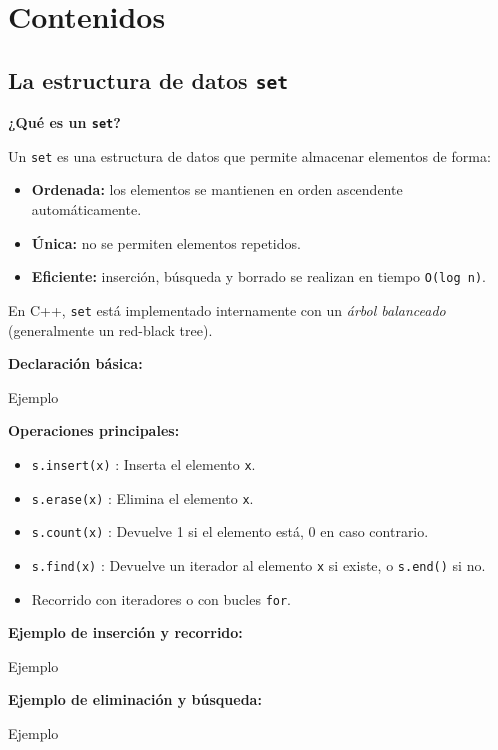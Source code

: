 \documentclass{article}
\newcommand{\cppfile}[2][]{
    \begin{container}{\faCode \space \space  #1}
        
    \end{container}
}
\begin{document}
\section{Contenidos}

\subsection{La estructura de datos \texttt{set}}

\textbf{¿Qué es un \texttt{set}?}

Un \texttt{set} es una estructura de datos que permite almacenar elementos de forma:
\begin{itemize}
    \item \textbf{Ordenada:} los elementos se mantienen en orden ascendente automáticamente.
    \item \textbf{Única:} no se permiten elementos repetidos.
    \item \textbf{Eficiente:} inserción, búsqueda y borrado se realizan en tiempo \texttt{O(log n)}.
\end{itemize}

En C++, \texttt{set} está implementado internamente con un \textit{árbol balanceado} (generalmente un red-black tree).

\textbf{Declaración básica:}

\cppfile[Ejemplo]{codes/set1.cpp}

\textbf{Operaciones principales:}
\begin{itemize}
    \item \texttt{s.insert(x)} : Inserta el elemento \texttt{x}.
    \item \texttt{s.erase(x)} : Elimina el elemento \texttt{x}.
    \item \texttt{s.count(x)} : Devuelve 1 si el elemento está, 0 en caso contrario.
    \item \texttt{s.find(x)} : Devuelve un iterador al elemento \texttt{x} si existe, o \texttt{s.end()} si no.
    \item Recorrido con iteradores o con bucles \texttt{for}.
\end{itemize}

\textbf{Ejemplo de inserción y recorrido:}

\cppfile[Ejemplo]{codes/set2.cpp}

\textbf{Ejemplo de eliminación y búsqueda:}

\cppfile[Ejemplo]{codes/set3.cpp}

\vspace{1.5cm}
\end{document}
